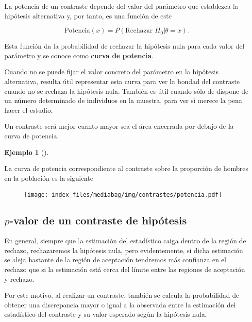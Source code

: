 \documentclass[
  a4paper,
]{scrreport}
\theoremstyle{definition}
\theoremstyle{definition}
\newtheorem{example}{Ejemplo}[chapter]
\theoremstyle{plain}
\theoremstyle{remark}
\begin{document}
La potencia de un contraste depende del valor del parámetro que
establezca la hipótesis alternativa y, por tanto, es una función de este

\[\mbox{Potencia}(x)= P(\mbox{Rechazar }H_0|\theta=x).\]

Esta función da la probabilidad de rechazar la hipótesis nula para cada
valor del parámetro y se conoce como \textbf{curva de potencia}.

Cuando no se puede fijar el valor concreto del parámetro en la hipótesis
alternativa, resulta útil representar esta curva para ver la bondad del
contraste cuando no se rechaza la hipótesis nula. También es útil cuando
sólo de dispone de un número determinado de individuos en la muestra,
para ver si merece la pena hacer el estudio.

Un contraste será mejor cuanto mayor sea el área encerrada por debajo de
la curva de potencia.

\begin{example}[]\protect\hypertarget{exm-curva-potencia}{}\label{exm-curva-potencia}

La curva de potencia correspondiente al contraste sobre la proporción de
hombres en la población es la siguiente

\begin{figure}

{\centering \texttt{[image: index\_files/mediabag/img/contrastes/potencia.pdf]}

}

\end{figure}

\end{example}

\hypertarget{p-valor-de-un-contraste-de-hipuxf3tesis}{%
\subsection{\texorpdfstring{\(p\)-valor de un contraste de
hipótesis}{p-valor de un contraste de hipótesis}}\label{p-valor-de-un-contraste-de-hipuxf3tesis}}

En general, siempre que la estimación del estadístico caiga dentro de la
región de rechazo, rechazaremos la hipótesis nula, pero evidentemente,
si dicha estimación se aleja bastante de la región de aceptación
tendremos más confianza en el rechazo que si la estimación está cerca
del límite entre las regiones de aceptación y rechazo.

Por este motivo, al realizar un contraste, también se calcula la
probabilidad de obtener una discrepancia mayor o igual a la observada
entre la estimación del estadístico del contraste y su valor esperado
según la hipótesis nula.
\end{document}
